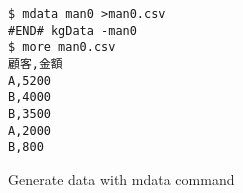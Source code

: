 \begin{figure}[htbp]
\begin{Verbatim}[baselinestretch=0.7,frame=single]
$ mdata man0 >man0.csv
#END# kgData -man0
$ more man0.csv
顧客,金額
A,5200
B,4000
B,3500
A,2000
B,800
\end{Verbatim}
\caption{Generate data with mdata command\label{fig:abstract0_1}}
\end{figure}
